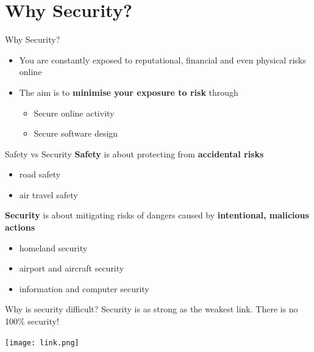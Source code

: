 \documentclass[aspectratio=169]{beamer}
\begin{document}

\section{Why Security?}
\frame{\sectionpage}

\begin{frame}{Why Security?}
	\begin{itemize}
		\item You are constantly exposed to reputational, financial and even physical risks online
		\item The aim is to \textbf{minimise your exposure to risk} through
        \begin{itemize}
        	\item Secure online activity
            \item Secure software design
        \end{itemize}
	\end{itemize}
\end{frame}

\begin{frame}{Safety vs Security}
\textbf{Safety} is about protecting from \textbf{accidental risks} 
\begin{itemize}
\item road safety
\item  air travel safety
\end{itemize}
\textbf{Security} is about mitigating risks of dangers
caused by \textbf{intentional, malicious actions} 
\begin{itemize}
\item homeland security
\item airport and aircraft security
\item information and computer security
\end{itemize}
\end{frame}

\begin{frame}{Why is security difficult?}
Security is as strong as the weakest link. There is no 100\% security!
\begin{center}
\texttt{[image: link.png]}
\end{center}
\end{frame}
\end{document}
